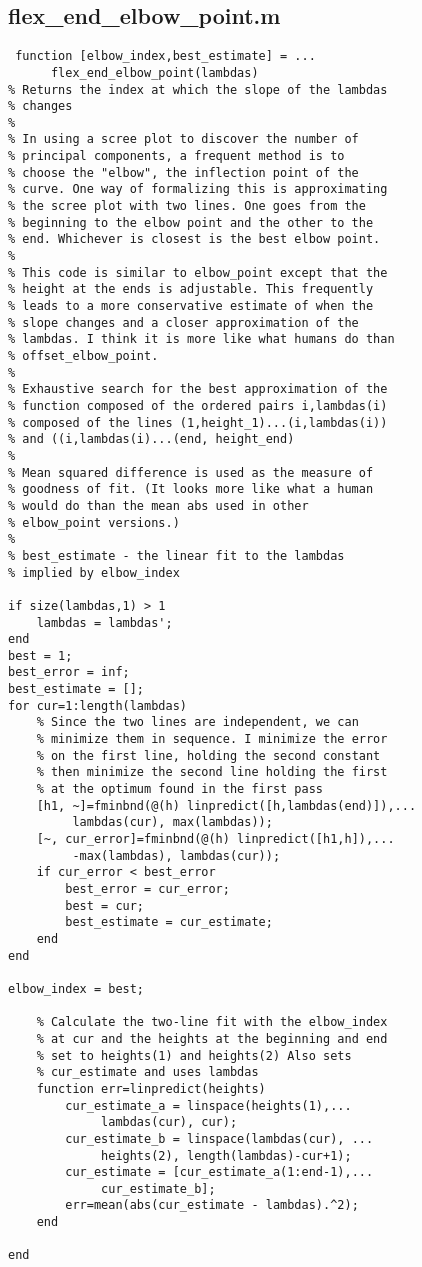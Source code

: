 \documentclass[eric_thesis.tex]{subfiles}
\begin{document}
\subsection{flex\_end\_elbow\_point.m}
\begin{lstlisting}
 function [elbow_index,best_estimate] = ...
      flex_end_elbow_point(lambdas)
% Returns the index at which the slope of the lambdas
% changes
%
% In using a scree plot to discover the number of
% principal components, a frequent method is to
% choose the "elbow", the inflection point of the
% curve. One way of formalizing this is approximating
% the scree plot with two lines. One goes from the
% beginning to the elbow point and the other to the
% end. Whichever is closest is the best elbow point.
%
% This code is similar to elbow_point except that the
% height at the ends is adjustable. This frequently
% leads to a more conservative estimate of when the
% slope changes and a closer approximation of the
% lambdas. I think it is more like what humans do than
% offset_elbow_point.
%
% Exhaustive search for the best approximation of the
% function composed of the ordered pairs i,lambdas(i)
% composed of the lines (1,height_1)...(i,lambdas(i))
% and ((i,lambdas(i)...(end, height_end)
%
% Mean squared difference is used as the measure of
% goodness of fit. (It looks more like what a human
% would do than the mean abs used in other
% elbow_point versions.)
%
% best_estimate - the linear fit to the lambdas
% implied by elbow_index

if size(lambdas,1) > 1
    lambdas = lambdas';
end
best = 1;
best_error = inf;
best_estimate = [];
for cur=1:length(lambdas)
    % Since the two lines are independent, we can
    % minimize them in sequence. I minimize the error
    % on the first line, holding the second constant
    % then minimize the second line holding the first
    % at the optimum found in the first pass
    [h1, ~]=fminbnd(@(h) linpredict([h,lambdas(end)]),...
         lambdas(cur), max(lambdas));
    [~, cur_error]=fminbnd(@(h) linpredict([h1,h]),...
         -max(lambdas), lambdas(cur));
    if cur_error < best_error
        best_error = cur_error;
        best = cur;
        best_estimate = cur_estimate;
    end
end

elbow_index = best;

    % Calculate the two-line fit with the elbow_index
    % at cur and the heights at the beginning and end
    % set to heights(1) and heights(2) Also sets
    % cur_estimate and uses lambdas
    function err=linpredict(heights)
        cur_estimate_a = linspace(heights(1),...
             lambdas(cur), cur);
        cur_estimate_b = linspace(lambdas(cur), ...
             heights(2), length(lambdas)-cur+1);
        cur_estimate = [cur_estimate_a(1:end-1),...
             cur_estimate_b];
        err=mean(abs(cur_estimate - lambdas).^2);
    end

end
\end{lstlisting}
\end{document}
